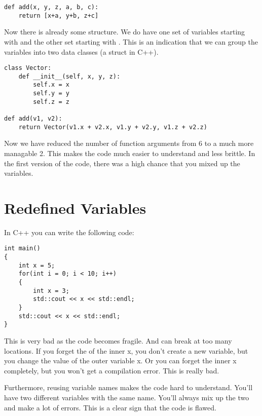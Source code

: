 \begin{programcode}{}
\begin{verbatim}
def add(x, y, z, a, b, c):
    return [x+a, y+b, z+c]
\end{verbatim}
\end{programcode}

Now there is already some structure. We do have one set of variables starting with  and the other set starting with . This is an indication that we can group the variables into two data classes (a struct in C++).

\begin{programcode}{}
\begin{verbatim}
class Vector:
    def __init__(self, x, y, z):
        self.x = x
        self.y = y
        self.z = z

def add(v1, v2):
    return Vector(v1.x + v2.x, v1.y + v2.y, v1.z + v2.z)
\end{verbatim}
\end{programcode}

Now we have reduced the number of function arguments from 6 to a much more managable 2. This makes the code much easier to understand and less brittle. In the first version of the code, there was a high chance that you mixed up the variables.

\section{Redefined Variables}

In C++ you can write the following code:

\begin{programcode}{}
\begin{verbatim}
int main()
{
    int x = 5;
    for(int i = 0; i < 10; i++)
    {
        int x = 3;
        std::cout << x << std::endl;
    }
    std::cout << x << std::endl;
}
\end{verbatim}
\end{programcode}

This is very bad as the code becomes fragile. And can break at too many locations. If you forget the  of the inner x, you don't create a new variable, but you change the value of the outer variable x. Or you can forget the inner x completely, but you won't get a compilation error. This is really bad.

Furthermore, reusing variable names makes the code hard to understand. You'll have two different variables with the same name. You'll always mix up the two and make a lot of errors. This is a clear sign that the code is flawed.

